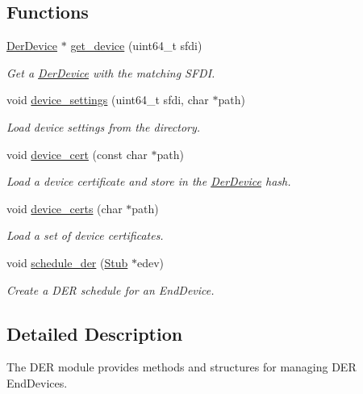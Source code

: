 \subsection*{Functions}
\begin{DoxyCompactItemize}
\item 
\hyperlink{structDerDevice}{Der\+Device} $\ast$ \hyperlink{group__der_ga8c23c07a7eb3a5b0d9896d8b771aa34c}{get\+\_\+device} (uint64\+\_\+t sfdi)
\begin{DoxyCompactList}\small\item\em Get a \hyperlink{structDerDevice}{Der\+Device} with the matching S\+F\+DI. \end{DoxyCompactList}\item 
void \hyperlink{group__der_ga40451d206ceaf9e1c8531f7d751056d7}{device\+\_\+settings} (uint64\+\_\+t sfdi, char $\ast$path)
\begin{DoxyCompactList}\small\item\em Load device settings from the directory. \end{DoxyCompactList}\item 
void \hyperlink{group__der_gafd7d2723cd9a24b23c7d06fda373a91e}{device\+\_\+cert} (const char $\ast$path)
\begin{DoxyCompactList}\small\item\em Load a device certificate and store in the \hyperlink{structDerDevice}{Der\+Device} hash. \end{DoxyCompactList}\item 
void \hyperlink{group__der_ga857218ef8ee25342bf29186a52db116b}{device\+\_\+certs} (char $\ast$path)
\begin{DoxyCompactList}\small\item\em Load a set of device certificates. \end{DoxyCompactList}\item 
void \hyperlink{group__der_gacd4c1d7510184ea16d1727e84d44b098}{schedule\+\_\+der} (\hyperlink{structStub}{Stub} $\ast$edev)
\begin{DoxyCompactList}\small\item\em Create a D\+ER schedule for an End\+Device. \end{DoxyCompactList}\end{DoxyCompactItemize}


\subsection{Detailed Description}
The D\+ER module provides methods and structures for managing D\+ER End\+Devices. 


